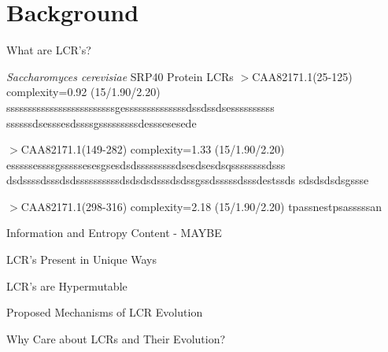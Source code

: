 \documentclass{beamer}
\begin{document}
	\section{Background}
	\begin{frame}{What are LCR's?}
		\label{link1}
		
		\begin{block}{\textit{Saccharomyces cerevisiae} SRP40 Protein LCRs}
			$>$CAA82171.1(25-125) complexity=0.92 (15/1.90/2.20)
			sssssssssssssssssssssssssgessssssssssssssdssdssdsessssssssss
			ssssssdsesssesdssssgsssssssssdesssesesede \newline
			
			$>$CAA82171.1(149-282) complexity=1.33 (15/1.90/2.20)
			esssssessssgsssssesesgsesdsdsssssssssdsesdsesdsqssssssssdsss
			dsdssssdsssdsdssssssssssdsdsdsdsssdsdssgssdsssssdsssdestssds
			sdsdsdsdsgssse \newline
			
			$>$CAA82171.1(298-316) complexity=2.18 (15/1.90/2.20)
			tpassnestpsasssssan
			
		\end{block}		
		
	\end{frame}

	\begin{frame}{Information and Entropy Content - MAYBE }
	
	
	\end{frame}

	\begin{frame}{LCR's Present in Unique Ways }
	
	
	\end{frame}

	\begin{frame}{LCR's are Hypermutable }
	
	
	\end{frame}

	\begin{frame}{Proposed Mechanisms of LCR Evolution }


	\end{frame}
	
	\begin{frame}{Why Care about LCRs and Their Evolution? }
	
	
	\end{frame}
\end{document}
